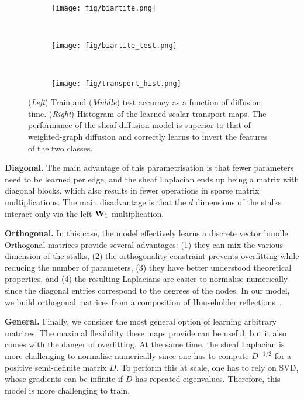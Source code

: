 \documentclass{article}
\def\mW{{\bf{W}}}
\begin{document}
\begin{figure}[t]
    \centering
    \begin{subfigure}[b]{0.3\columnwidth}
        \centering
        \texttt{[image: fig/biartite.png]}
    \end{subfigure}
    ~
    \begin{subfigure}[b]{0.3\columnwidth}
        \centering
        \texttt{[image: fig/biartite\_test.png]}
    \end{subfigure}
    ~
    \begin{subfigure}[b]{0.3\columnwidth}
        \centering
        \texttt{[image: fig/transport\_hist.png]}
    \end{subfigure}
    \caption{(\textit{Left}) Train and (\textit{Middle}) test accuracy as a function of diffusion time. (\textit{Right}) Histogram of the learned scalar transport maps. The performance of the sheaf diffusion model is superior to that of weighted-graph diffusion and correctly learns to invert the features of the two classes.}
    \label{fig:bipartite_graph}
    \vspace{-12pt}
\end{figure}

\textbf{Diagonal. } 
The main advantage of this parametrisation is that fewer parameters need to be learned per edge, and the sheaf Laplacian ends up being a matrix with diagonal blocks, which also results in fewer operations in sparse matrix multiplications. The main disadvantage is that the $d$ dimensions of the stalks interact only via the left $\mW_1$ multiplication. 

\textbf{Orthogonal. } In this case, the model effectively learns a discrete vector bundle. Orthogonal matrices provide several advantages: (1) they can mix the various dimension of the stalks, (2) the orthogonality constraint prevents overfitting while reducing the number of parameters, (3) they have better understood theoretical properties, and (4) the resulting Laplacians are easier to normalise numerically since the diagonal entries correspond to the degrees of the nodes. In our model, we build orthogonal matrices from a composition of Householder reflections~\citep{mhammedi2017efficient}. 

\textbf{General. } Finally, we consider the most general option of learning arbitrary matrices. The maximal flexibility these maps provide can be useful, but it also comes with the danger of overfitting. At the same time, the sheaf Laplacian is more challenging to normalise numerically since one has to compute $D^{-1/2}$ for a positive semi-definite matrix $D$. To perform this at scale, one has to rely on SVD, whose gradients can be infinite if $D$ has repeated eigenvalues. Therefore, this model is more challenging to train. 
\end{document}
